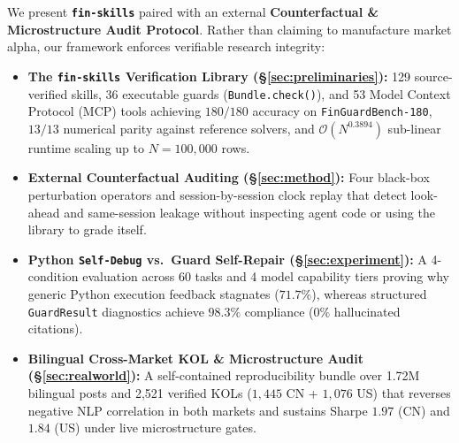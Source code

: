 We present \textbf{\texttt{fin-skills}} paired with an external \textbf{Counterfactual \& Microstructure Audit Protocol}. Rather than claiming to manufacture market alpha, our framework enforces verifiable research integrity:
\begin{itemize}
    \item \textbf{The \texttt{fin-skills} Verification Library (\S\ref{sec:preliminaries}):} 129 source-verified skills, 36 executable guards (\texttt{Bundle.check()}), and 53 Model Context Protocol (MCP) tools achieving $180/180$ accuracy on \texttt{FinGuardBench-180}, $13/13$ numerical parity against reference solvers, and $\mathcal{O}(N^{0.3894})$ sub-linear runtime scaling up to $N=100{,}000$ rows.
    \item \textbf{External Counterfactual Auditing (\S\ref{sec:method}):} Four black-box perturbation operators and session-by-session clock replay that detect look-ahead and same-session leakage without inspecting agent code or using the library to grade itself.
    \item \textbf{Python \texttt{Self-Debug} vs.\ Guard Self-Repair (\S\ref{sec:experiment}):} A 4-condition evaluation across 60 tasks and 4 model capability tiers proving why generic Python execution feedback stagnates ($71.7\%$), whereas structured \texttt{GuardResult} diagnostics achieve $98.3\%$ compliance ($0\%$ hallucinated citations).
    \item \textbf{Bilingual Cross-Market KOL \& Microstructure Audit (\S\ref{sec:realworld}):} A self-contained reproducibility bundle over 1.72M bilingual posts and 2,521 verified KOLs ($1{,}445$ CN + $1{,}076$ US) that reverses negative NLP correlation in both markets and sustains Sharpe $1.97$ (CN) and $1.84$ (US) under live microstructure gates.
\end{itemize}

